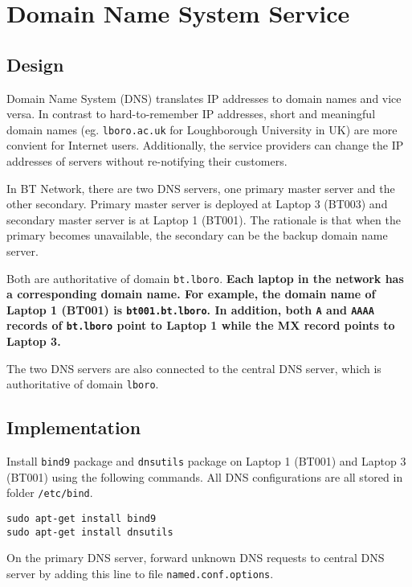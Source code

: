 \section{Domain Name System Service}
\label{sec:dns}

\subsection{Design}

Domain Name System (DNS)\citep{rfc1035} translates IP addresses to domain names and vice versa.
In contrast to hard-to-remember IP addresses, short and meaningful domain names (eg. \texttt{lboro.ac.uk} for Loughborough University in UK) are more convient for Internet users. 
Additionally, the service providers can change the IP addresses of servers without re-notifying their customers.

In BT Network, there are two DNS servers, one primary master server and the other secondary. Primary master server is deployed at Laptop 3 (BT003) and secondary master server is at Laptop 1 (BT001). 
The rationale is that when the primary becomes unavailable, the secondary can be the backup domain name server.

Both are authoritative of domain \texttt{bt.lboro}. \textbf{Each laptop in the network has a corresponding domain name. For example, the domain name of Laptop 1 (BT001) is \texttt{bt001.bt.lboro}. In addition, both \texttt{A} and \texttt{AAAA} records of \texttt{bt.lboro} point to Laptop 1 while the MX record points to Laptop 3.}

The two DNS servers are also connected to the central DNS server, which is authoritative of domain \texttt{lboro}.



\subsection{Implementation}

Install \texttt{bind9} package and \texttt{dnsutils} package on Laptop 1 (BT001) and Laptop 3 (BT001) using the following commands. All DNS configurations are all stored in folder \texttt{/etc/bind}.

\begin{lstlisting}
sudo apt-get install bind9
sudo apt-get install dnsutils
\end{lstlisting}


On the primary DNS server, forward unknown DNS requests to central DNS server by adding this line to file \texttt{named.conf.options}.

